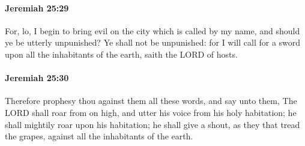 		\paragraph{Jeremiah 25:29} %
			\label{JEREMIAH-25-29}

			For, lo, I begin to bring evil on the city which is called by my name, and should ye be utterly unpunished? Ye shall not be unpunished: for I will call for a sword upon all the inhabitants of the earth, saith the LORD of hosts.


		\paragraph{Jeremiah 25:30} %
			\label{JEREMIAH-25-30}

			Therefore prophesy thou against them all these words, and say unto them, The LORD shall roar from on high, and utter his voice from his holy habitation; he shall mightily roar upon his habitation; he shall give a shout, as they that tread the grapes, against all the inhabitants of the earth.

